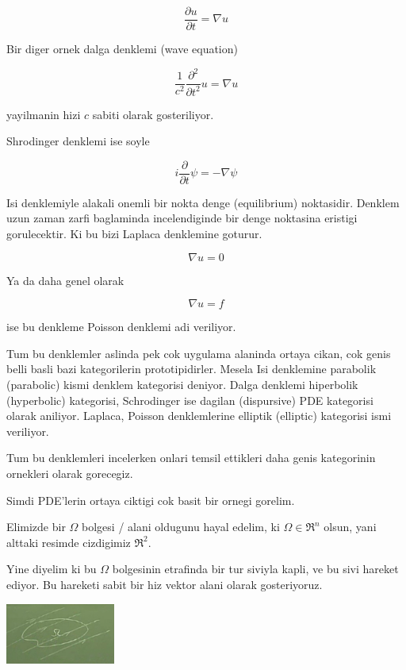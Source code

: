 \documentclass[12pt,fleqn]{article}
\begin{document}
\[ \frac{\partial u}{\partial t} = 
\nabla  u
\]

Bir diger ornek dalga denklemi (wave equation)

\[ \frac{1}{c^2} \frac{\partial ^2}{\partial t^2}u = \nabla u\]

yayilmanin hizi $c$ sabiti olarak gosteriliyor. 

Shrodinger denklemi ise soyle

\[ i \frac{\partial }{\partial t}\psi  = -\nabla \psi \]

Isi denklemiyle alakali onemli bir nokta denge (equilibrium)
noktasidir. Denklem uzun zaman zarfi baglaminda incelendiginde bir denge
noktasina eristigi gorulecektir. Ki bu bizi Laplaca denklemine goturur. 

\[ \nabla u = 0 \]

Ya da daha genel olarak 

\[ \nabla u = f \]

ise bu denkleme Poisson denklemi adi veriliyor. 

Tum bu denklemler aslinda pek cok uygulama alaninda ortaya cikan, cok genis
belli basli bazi kategorilerin prototipidirler. Mesela Isi denklemine
parabolik (parabolic) kismi denklem kategorisi deniyor. Dalga denklemi
hiperbolik (hyperbolic) kategorisi, Schrodinger ise dagilan (dispursive)
PDE kategorisi olarak aniliyor. Laplaca, Poisson denklemlerine elliptik
(elliptic) kategorisi ismi veriliyor. 

Tum bu denklemleri incelerken onlari temsil ettikleri daha genis
kategorinin ornekleri olarak gorecegiz. 

Simdi PDE'lerin ortaya ciktigi cok basit bir ornegi gorelim. 

Elimizde bir $\Omega$ bolgesi / alani oldugunu hayal edelim, ki $\Omega \in
\Re^n$ olsun, 
yani alttaki resimde cizdigimiz $\Re^2$.

Yine diyelim ki bu $\Omega$ bolgesinin etrafinda bir tur siviyla kapli, ve
bu sivi hareket ediyor. Bu hareketi sabit bir hiz vektor alani olarak
gosteriyoruz. 

\includegraphics[height=2cm]{pde_01.png}
\end{document}

